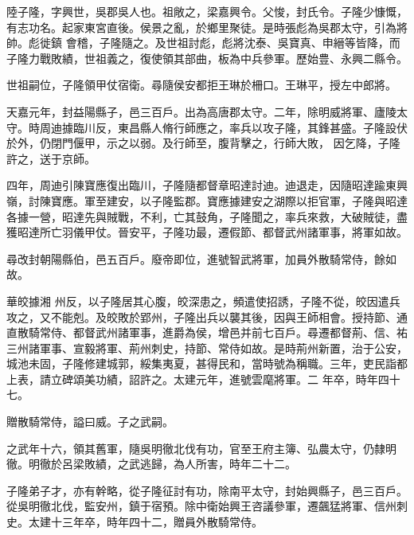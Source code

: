 
\begin{pinyinscope}

 陸子隆，字興世，吳郡吳人也。祖敞之，梁嘉興令。父悛，封氏令。子隆少慷慨，有志功名。起家東宮直後。侯景之亂，於鄉里聚徒。是時張彪為吳郡太守，引為將帥。彪徙鎮
 會稽，子隆隨之。及世祖討彪，彪將沈泰、吳寶真、申縉等皆降，而子隆力戰敗績，世祖義之，復使領其部曲，板為中兵參軍。歷始豊、永興二縣令。



 世祖嗣位，子隆領甲仗宿衛。尋隨侯安都拒王琳於柵口。王琳平，授左中郎將。



 天嘉元年，封益陽縣子，邑三百戶。出為高唐郡太守。二年，除明威將軍、廬陵太守。時周迪據臨川反，東昌縣人脩行師應之，率兵以攻子隆，其鋒甚盛。子隆設伏於外，仍閉門偃甲，示之以弱。及行師至，腹背擊之，行師大敗，
 因乞降，子隆許之，送于京師。



 四年，周迪引陳寶應復出臨川，子隆隨都督章昭達討迪。迪退走，因隨昭達踰東興嶺，討陳寶應。軍至建安，以子隆監郡。寶應據建安之湖際以拒官軍，子隆與昭達各據一營，昭達先與賊戰，不利，亡其鼓角，子隆聞之，率兵來救，大破賊徒，盡獲昭達所亡羽儀甲仗。晉安平，子隆功最，遷假節、都督武州諸軍事，將軍如故。



 尋改封朝陽縣伯，邑五百戶。廢帝即位，進號智武將軍，加員外散騎常侍，餘如故。



 華皎據湘
 州反，以子隆居其心腹，皎深患之，頻遣使招誘，子隆不從，皎因遣兵攻之，又不能剋。及皎敗於郢州，子隆出兵以襲其後，因與王師相會。授持節、通直散騎常侍、都督武州諸軍事，進爵為侯，增邑并前七百戶。尋遷都督荊、信、祐三州諸軍事、宣毅將軍、荊州刺史，持節、常侍如故。是時荊州新置，治于公安，城池未固，子隆修建城郭，綏集夷夏，甚得民和，當時號為稱職。三年，吏民詣都上表，請立碑頌美功績，詔許之。太建元年，進號雲麾將軍。二
 年卒，時年四十七。



 贈散騎常侍，謚曰威。子之武嗣。



 之武年十六，領其舊軍，隨吳明徹北伐有功，官至王府主簿、弘農太守，仍隸明徹。明徹於呂梁敗績，之武逃歸，為人所害，時年二十二。



 子隆弟子才，亦有幹略，從子隆征討有功，除南平太守，封始興縣子，邑三百戶。從吳明徹北伐，監安州，鎮于宿預。除中衛始興王咨議參軍，遷飆猛將軍、信州刺史。太建十三年卒，時年四十二，贈員外散騎常侍。




\end{pinyinscope}
